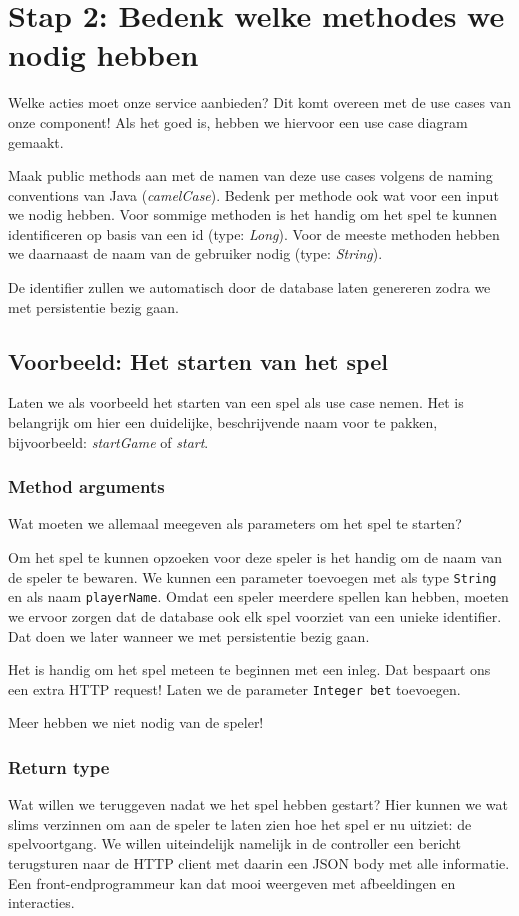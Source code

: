 \section{Stap 2: Bedenk welke methodes we nodig hebben}
Welke acties moet onze service aanbieden? 
Dit komt overeen met de use cases van onze component! 
Als het goed is, hebben we hiervoor een use case diagram gemaakt.

Maak public methods aan met de namen van deze use cases volgens 
de naming conventions van Java (\textit{camelCase}). 
Bedenk per methode ook wat voor een input we nodig hebben.
Voor sommige methoden is het handig om het spel te kunnen identificeren
op basis van een id (type: \textit{Long}). Voor de meeste methoden hebben 
we daarnaast de naam van de gebruiker nodig (type: \textit{String}).

De identifier zullen we automatisch door de database laten genereren
zodra we met persistentie bezig gaan.

\subsection{Voorbeeld: Het starten van het spel}
Laten we als voorbeeld het starten van een spel als use case nemen.
Het is belangrijk om hier een duidelijke, beschrijvende naam voor te pakken,
bijvoorbeeld: \textit{startGame} of \textit{start}.

\subsubsection{Method arguments}
Wat moeten we allemaal meegeven als parameters om het spel te starten?

Om het spel te kunnen opzoeken voor deze speler is het handig om de naam van de speler  
te bewaren. We kunnen een parameter toevoegen met als type \texttt{String} en 
als naam \texttt{playerName}. 
Omdat een speler meerdere spellen kan hebben, moeten we ervoor zorgen 
dat de database ook elk spel voorziet van een unieke identifier. 
Dat doen we later wanneer we met persistentie bezig gaan.

Het is handig om het spel meteen te beginnen met een inleg. Dat bespaart ons een
extra HTTP request! Laten we de parameter \texttt{Integer bet} toevoegen.

Meer hebben we niet nodig van de speler!

\subsubsection{Return type}
Wat willen we teruggeven nadat we het spel hebben gestart? 
Hier kunnen we wat slims verzinnen om aan de speler te laten zien hoe 
het spel er nu uitziet: de spelvoortgang. 
We willen uiteindelijk namelijk in de controller
een bericht terugsturen naar de HTTP client met daarin een JSON body 
met alle informatie. Een front-endprogrammeur kan dat mooi weergeven met
afbeeldingen en interacties.

